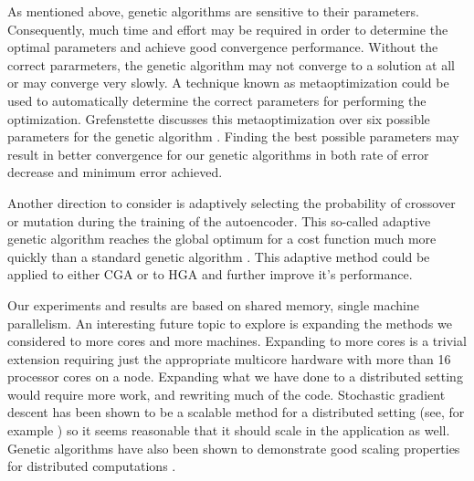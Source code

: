 As mentioned above, genetic algorithms are sensitive to their parameters. Consequently, much time and effort may be required in order to determine the optimal parameters and achieve good convergence performance. Without the correct pararmeters, the genetic algorithm may not converge to a solution at all or may converge very slowly. A technique known as metaoptimization could be used to automatically determine the correct parameters for performing the optimization. Grefenstette discusses this metaoptimization over six possible parameters for the genetic algorithm \cite{metaoptimization}. Finding the best possible parameters may result in better convergence for our genetic algorithms in both rate of error decrease and minimum error achieved.

Another direction to consider is adaptively selecting the probability of crossover or mutation during the training of the autoencoder. This so-called adaptive genetic algorithm reaches the global optimum for a cost function much more quickly than a standard genetic algorithm \cite{srinivas94adaptive}. This adaptive method could be applied to either CGA or to HGA and further improve it's performance.

Our experiments and results are based on shared memory, single machine parallelism. An interesting future topic to explore is expanding the methods we considered to more cores and more machines. Expanding to more cores is a trivial extension requiring just the appropriate multicore hardware with more than 16 processor cores on a node. Expanding what we have done to a distributed setting would require more work, and rewriting much of the code. Stochastic gradient descent has been shown to be a scalable method for a distributed setting (see, for example \cite{zinkevich2010psgd}) so it seems reasonable that it should scale in the application as well. Genetic algorithms have also been shown to demonstrate good scaling properties for distributed computations \cite{Belding95thedistributed}.
